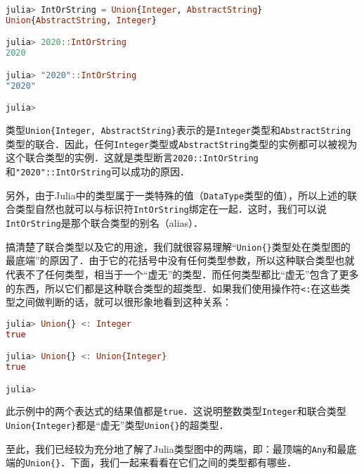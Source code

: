 \begin{lstlisting}[language=julia]
julia> IntOrString = Union{Integer, AbstractString} 
Union{AbstractString, Integer}

julia> 2020::IntOrString
2020

julia> "2020"::IntOrString
"2020"

julia> 
\end{lstlisting}

类型\verb|Union{Integer, AbstractString}|表示的是\verb|Integer|类型和\verb|AbstractString|类型的联合．因此，任何\verb|Integer|类型或\verb|AbstractString|类型的实例都可以被视为这个联合类型的实例．这就是类型断言\verb|2020::IntOrString|和\verb|"2020"::IntOrString|可以成功的原因．

另外，由于Julia中的类型属于一类特殊的值（\verb|DataType|类型的值），所以上述的联合类型自然也就可以与标识符\verb|IntOrString|绑定在一起．这时，我们可以说\verb|IntOrString|是那个联合类型的别名（alias）．

搞清楚了联合类型以及它的用途，我们就很容易理解“\verb|Union{}|类型处在类型图的最底端”的原因了．由于它的花括号中没有任何类型参数，所以这种联合类型也就代表不了任何类型，相当于一个“虚无”的类型．而任何类型都比“虚无”包含了更多的东西，所以它们都是这种联合类型的超类型．如果我们使用操作符\verb|<:|在这些类型之间做判断的话，就可以很形象地看到这种关系：

\begin{lstlisting}[language=julia]
julia> Union{} <: Integer
true

julia> Union{} <: Union{Integer}
true

julia> 
\end{lstlisting}

此示例中的两个表达式的结果值都是\verb|true|．这说明整数类型\verb|Integer|和联合类型\verb|Union{Integer}|都是“虚无”类型\verb|Union{}|的超类型．

至此，我们已经较为充分地了解了Julia类型图中的两端，即：最顶端的\verb|Any|和最底端的\verb|Union{}|．下面，我们一起来看看在它们之间的类型都有哪些．